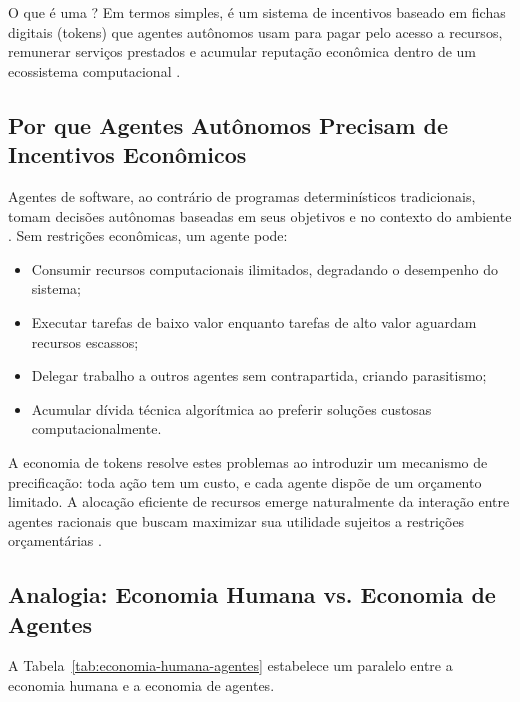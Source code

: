 O que é uma ? Em termos simples, é um
sistema de incentivos baseado em fichas digitais (tokens) que
agentes autônomos usam para pagar pelo acesso a recursos, remunerar
serviços prestados e acumular reputação econômica dentro de um
ecossistema computacional \cite{opencode2026token,
buterin2014next}.

\subsection{Por que Agentes Autônomos Precisam de Incentivos Econômicos}

Agentes de software, ao contrário de programas determinísticos
tradicionais, tomam decisões autônomas baseadas em seus objetivos
e no contexto do ambiente \cite{russell2020inteligencia,
wooldridge2009multiagent}. Sem restrições econômicas, um agente
pode:

\begin{itemize}
\item Consumir recursos computacionais ilimitados, degradando o
desempenho do sistema;
\item Executar tarefas de baixo valor enquanto tarefas de alto
valor aguardam recursos escassos;
\item Delegar trabalho a outros agentes sem contrapartida,
criando parasitismo;
\item Acumular dívida técnica algorítmica ao preferir soluções
custosas computacionalmente.
\end{itemize}

A economia de tokens resolve estes problemas ao introduzir um
mecanismo de precificação: toda ação tem um custo, e cada agente
dispõe de um orçamento limitado. A alocação eficiente de recursos
emerge naturalmente da interação entre agentes racionais que buscam
maximizar sua utilidade sujeitos a restrições orçamentárias
\cite{vonneumann1944theory, nash1950equilibrium}.

\subsection{Analogia: Economia Humana vs. Economia de Agentes}

A Tabela~\ref{tab:economia-humana-agentes} estabelece um paralelo
entre a economia humana e a economia de agentes.


